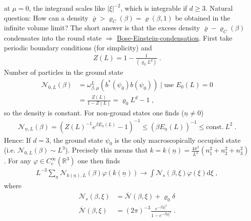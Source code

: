 \documentclass[
a4paper, %
11pt, %
onecolumn, %
openany, %
]{memoir}
\theoremstyle{definition}
\theoremstyle{remark}
\theoremstyle{plain}
\begin{document}
at $\mu=0$, the integrand scales like $|\xi|^{-2}$, which is integrable if $d\geq 3$. Natural question: How can a density $\overline{\varrho}>\varrho_C(\beta)=\varrho(\beta,1)$ be obtained in the infinite volume limit? The short answer is that the excess density $\overline{\varrho}-\varrho_C(\beta)$ condensates into the round state $\Rightarrow$ \underline{Bose-Einstein-condensation}.
First take periodic boundary conditions (for simplicity) and \begin{align}
Z(L)=1-\frac{1}{(\varrho_0L^d)}\; .
\end{align}
Number of particles in the ground state \begin{align}
\mathcal{N}_{0,L}(\beta)&=\omega_{\beta,\mu}^L(b^*(\psi_0)b(\psi_0))\mid \text{use }E_0(L)=0\\&=\frac{Z(L)}{1-Z(L)}=\varrho_0 L^d-1\; ,
\end{align}
so the density is constant. For non-ground states one finds ($\underline{n}\neq 0$) \begin{align}
\mathcal{N}_{\underline{n},L}(\beta)=(Z(L)^{-1}e^{\beta E_{\underline{n}}(L)}-1)^{-1}\leq (\beta E_{\underline{n}}(L))^{-1}\leq \mathrm{const. }~L^2\; .
\end{align}
Hence: If $d=3$, the ground state $\psi_0$ is the only macroscopically occupied state (i.e. $\mathcal{N}_{0,L}(\beta)\sim L^3$). Precisely this means that $k=k(\underline{n})=\frac{4\pi^2}{L^2}(n_1^2+n_2^2+n_3^2)$. For any $\varphi\in C_c^{\infty}(\mathbb{R}^3)$ one then finds \begin{align}
L^{-3}\sum_{\underline{n}}\mathcal{N}_{k(\underline{n}),L}(\beta)\varphi(k(\underline{n}))\rightarrow \int \mathcal{N}_s(\beta,\xi)\varphi(\xi)\mathrm{d}\xi\; ,
\end{align}
where  \begin{align}\mathcal{N}_s(\beta,\xi)&=\overline{\mathcal{N}}(\beta,\xi)+\varrho_0 \delta \\
\overline{\mathcal{N}}(\beta,\xi)&=(2\pi)^{-3}\frac{e^{-\beta|\xi|^2}}{1-e^{-\beta|\xi|^2}}\; .
\end{align}
\backmatter
\end{document}

